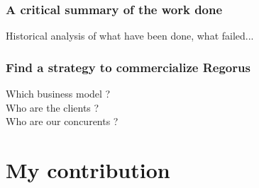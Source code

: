 \documentclass[10pt]{article}
\begin{document}
\subsubsection{A critical summary of the work done}
Historical analysis of what have been done, what failed...

\subsubsection{Find a strategy to commercialize Regorus}
Which business model ?\\
Who are the clients ?\\
Who are our concurents ?\\

\section{My contribution}


\newpage


\newpage

\pagestyle{plain}
\nocite{*}
\printbibliography[title={Book references},type=book]
\printbibliography[title={Article references},type=article]
\printbibliography[title={Online references},type=online]

\printbibliography[title={Other references}, nottype=online,nottype=article, nottype=book]
\end{document}
